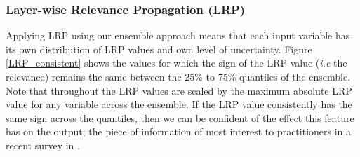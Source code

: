 \documentclass[a4paper]{article}
\begin{document}
\subsubsection{Layer-wise Relevance Propagation (LRP)}\label{LRP_results}
Applying LRP using our ensemble approach means that each input variable has its own distribution of LRP values and own level of uncertainty. Figure \ref{LRP_consistent} shows the values for which the sign of the LRP value (\textit{i.e} the relevance) remains the same between the 25\% to 75\% quantiles of the ensemble. Note that throughout the LRP values are scaled by the maximum absolute LRP value for any variable across the ensemble. If the LRP value consistently has the same sign across the quantiles, then we can be confident of the effect this feature has on the output; the piece of information of most interest to practitioners in a recent survey in \cite{lakkaraju2022rethinking}.
\end{document}

